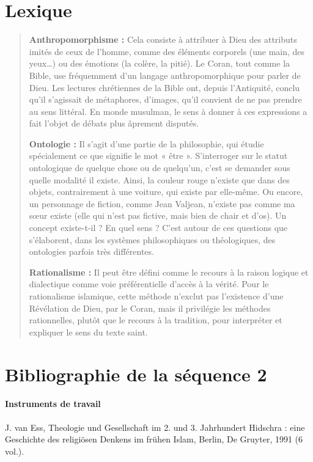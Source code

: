\section{Lexique}
\begin{quote}
\textbf{Anthropomorphisme :} Cela consiste à attribuer à Dieu des
attributs imités de ceux de l'homme, comme des éléments corporels (une
main, des yeux\ldots) ou des émotions (la colère, la pitié). Le Coran,
tout comme la Bible, use fréquemment d'un langage anthropomorphique pour
parler de Dieu. Les lectures chrétiennes de la Bible ont, depuis
l'Antiquité, conclu qu'il s'agissait de métaphores, d'images, qu'il
convient de ne pas prendre au sens littéral. En monde musulman, le sens
à donner à ces expressions a fait l'objet de débats plus âprement
disputés.

\textbf{Ontologie :} Il s'agit d'une partie de la philosophie, qui
étudie spécialement ce que signifie le mot « être ». S'interroger sur le
statut ontologique de quelque chose ou de quelqu'un, c'est se demander
sous quelle modalité il existe. Ainsi, la couleur rouge n'existe que
dans des objets, contrairement à une voiture, qui existe par elle-même.
Ou encore, un personnage de fiction, comme Jean Valjean, n'existe pas
comme ma sœur existe (elle qui n'est pas fictive, mais bien de chair et
d'os). Un concept existe-t-il ? En quel sens ? C'est autour de ces
questions que s'élaborent, dans les systèmes philosophiques ou
théologiques, des ontologies parfois très différentes.

\textbf{Rationalisme :} Il peut être défini comme le recours à la raison
logique et dialectique comme voie préférentielle d'accès à la vérité.
Pour le rationalisme islamique, cette méthode n'exclut pas l'existence
d'une Révélation de Dieu, par le Coran, mais il privilégie les méthodes
rationnelles, plutôt que le recours à la tradition, pour interpréter et
expliquer le sens du texte saint.

\end{quote}



\section{Bibliographie de la séquence 2}


\paragraph{Instruments de travail}
J. van Ess, Theologie und Gesellschaft im 2. und 3. Jahrhundert Hidschra : eine Geschichte des religiösen Denkens im frühen Islam, Berlin, De Gruyter, 1991 (6 vol.).


